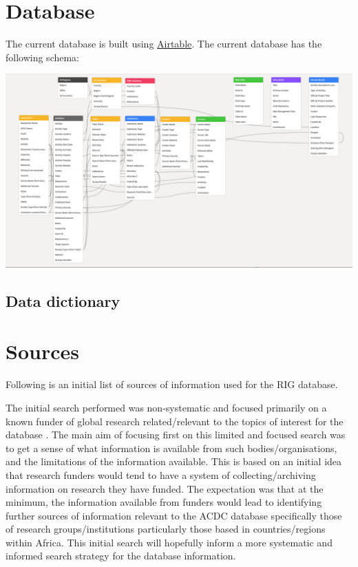 \documentclass[
]{book}
\begin{document}
\hypertarget{database}{%
\chapter{Database}\label{database}}

The current database is built using \href{https://airtable.com}{Airtable}. The current database has the following schema:

\includegraphics{images/database_schema.png}

\hypertarget{data-dictionary}{%
\section{Data dictionary}\label{data-dictionary}}

\hypertarget{sources}{%
\chapter{Sources}\label{sources}}

Following is an initial list of sources of information used for the RIG database.

The initial search performed was non-systematic and focused primarily on a known funder of global research related/relevant to the topics of interest for the database . The main aim of focusing first on this limited and focused search was to get a sense of what information is available from such bodies/organisations, and the limitations of the information available. This is based on an initial idea that research funders would tend to have a system of collecting/archiving information on research they have funded. The expectation was that at the minimum, the information available from funders would lead to identifying further sources of information relevant to the ACDC database specifically those of research groups/institutions particularly those based in countries/regions within Africa. This initial search will hopefully inform a more systematic and informed search strategy for the database information.
\end{document}
